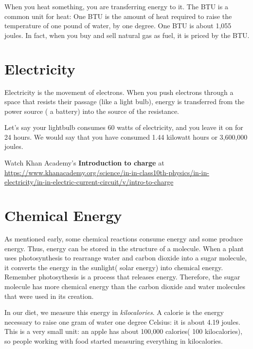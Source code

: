 When you heat something, you are transferring energy to it. The BTU
 is a common unit for heat: One BTU is the
amount of heat required to raise the temperature of one pound of water,
by one degree. One BTU is about 1,055 joules. In fact, when you buy and sell
natural gas as fuel, it is priced by the BTU. 

\section{Electricity}

Electricity is the movement of electrons. When you push electrons
through a space that resists their passage (like a light bulb),
energy is transferred from the power source ( a battery)
 into the source of the resistance.

Let's say your lightbulb consumes 60 watts of electricity, and you leave it on for 24 hours.
We would say that you have consumed 1.44 kilowatt hours or 3,600,000 joules.

Watch Khan Academy's \textbf{Introduction to charge} at \url{https://www.khanacademy.org/science/in-in-class10th-physics/in-in-electricity/in-in-electric-current-circuit/v/intro-to-charge}

\section{Chemical Energy}

As mentioned early, some chemical reactions consume energy and some
produce energy. Thus, energy can be stored in the structure of a
molecule. When a plant uses photosynthesis to rearrange water and
carbon dioxide into a sugar molecule, it converts the energy in
the sunlight( solar energy) into chemical energy. Remember photosythesis is a process that releases energy.
Therefore, the sugar molecule has more chemical energy than the carbon dioxide and water molecules that were
used in its creation.

In our diet, we measure this energy in \textit{kilocalories}. A
calorie is the energy necessary to raise one gram of water one degree
Celsius: it is about 4.19 joules. This is a very small unit: an apple
has about 100,000 calories( 100 kilocalories), so people working with food started
measuring everything in kilocalories.

